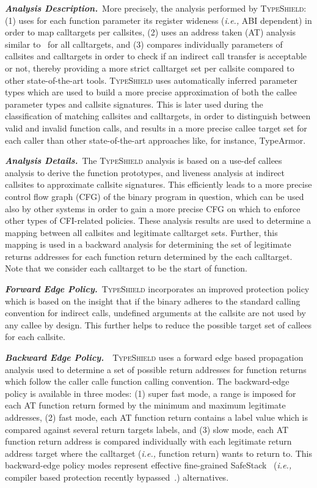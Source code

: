 \textbf{\textit{Analysis Description.}}~More precisely, the analysis performed by \textsc{TypeShield}:
(1) uses for each function parameter its register wideness (\textit{i.e.,} ABI dependent) in order to map calltargets per callsites,  
(2) uses an address taken (AT) analysis similar to~\cite{veen:typearmor} for all calltargets, and 
(3) compares individually parameters of callsites and calltargets in order to check if an indirect call transfer is acceptable or not, 
thereby providing a more strict calltarget set per callsite compared to other state-of-the-art tools.
\textsc{TypeShield} uses automatically inferred parameter types which are used to build 
a more precise approximation of both the callee parameter types and callsite signatures. 
This is later used during the classification of matching callsites and calltargets, in order to 
distinguish between valid and invalid function calls, and results in a more precise callee target 
set for each caller than other state-of-the-art approaches like, for instance, TypeArmor.

\textbf{\textit{Analysis Details.}}~The \textsc{TypeShield} analysis is based on a use-def callees analysis 
to derive the function prototypes, 
and liveness analysis at indirect callsites to approximate callsite signatures. This 
efficiently leads to a more precise control flow graph (CFG) of the binary program in question, 
which can be used also by other systems in order to gain a more precise CFG on which to 
enforce other types of CFI-related policies. These analysis results are used to
determine a mapping between all callsites and legitimate calltarget sets. Further,
this mapping is used in a backward analysis for determining the set of legitimate 
returns addresses for each function return determined by the each calltarget. Note that 
we consider each calltarget to be the start of function.

\textbf{\textit{Forward Edge Policy.}}~\textsc{TypeShield} incorporates an improved protection policy which is
based on the insight that if the binary adheres to the standard calling convention
for indirect calls, undefined arguments at the callsite are not used by any callee by design. 
This further helps to reduce the possible target set of callees for each callsite.

\textbf{\textit{Backward Edge Policy.}}~~\textsc{TypeShield} uses a forward edge based propagation analysis used to determine a 
set of possible return addresses for function returns which follow the caller calle function calling convention.
The backward-edge policy is available in three modes: 
(1) super fast mode, a range is imposed for each AT function return formed by the minimum and maximum legitimate addresses,
(2) fast mode, each AT function return contains a label value which is compared against several return targets labels, and
(3) slow mode, each AT function return address is compared individually with each legitimate return address target where the calltarget (\textit{i.e.,} function return) wants to return to.
This backward-edge policy modes represent effective fine-grained SafeStack~\cite{volodymyr:cpi} (\textit{i.e.,} compiler based protection recently bypassed~\cite{safestack:bypassing}.) alternatives. 

